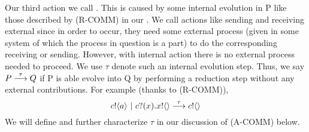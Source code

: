 Our third action we call . This is caused by some internal evolution in P like those described by (R-COMM) in our .  
We call actions like sending and receiving external since in order to occur, they need some external process (given in some system of which the process in question is a part) to do the corresponding receiving or sending. However, with internal action there is no external process needed to proceed.  
We use $\tau$ denote such an internal evolution step.  
Thus, we say $P \overset{{\tau}}{\longrightarrow} Q$ if P is able evolve into Q by performing a reduction step without any external contributions.  
For example (thanks to (R-COMM)),
\[
	{c}!\langle{a}\rangle \ |\  {c}?({x}).{x}!\langle{}\rangle \overset{{\tau}}{\longrightarrow} {c}!\langle{}\rangle 
\]
We will define and further characterize $\tau$ in our discussion of (A-COMM) below.

